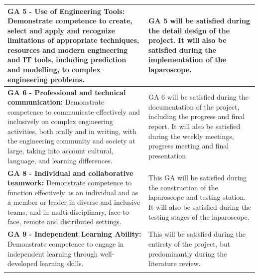 \begin{longtable}{|p{}|p{}|}
\textbf{GA 5 - Use of Engineering Tools:} Demonstrate competence to create, select and apply and recognize limitations of appropriate techniques, resources and modern engineering and IT tools, including prediction and modelling, to complex engineering problems.
& 
GA 5 will be satisfied during the detail design of the project. It will also be satisfied during the implementation of the laparoscope. \\
\hline

\textbf{GA 6 - Professional and technical communication:} Demonstrate competence to communicate effectively and inclusively on complex engineering activities, both orally and in writing, with the engineering community and society at large, taking into account cultural, language, and learning differences.
& 
GA 6 will be satisfied during the documentation of the project, including the progress and final report. It will also be satisfied during the weekly meetings, progress meeting and final presentation. \\
\hline

\textbf{GA 8 - Individual and collaborative teamwork:} Demonstrate competence to function effectively as an individual and as a member or leader in diverse and inclusive teams, and in multi-disciplinary, face-to-face, remote and distributed settings.
& 
This GA will be satisfied during the construction of the laparoscope and testing station. It will also be satisfied during the testing stages of the laparoscope. \\
\hline

\textbf{GA 9 - Independent Learning Ability:} Demonstrate competence to engage in independent learning through well-developed learning skills.
& 
This will be satisfied during the entirety of the project, but predominantly during the literature review. \\
\hline



\label{tab:longtable}
\end{longtable}